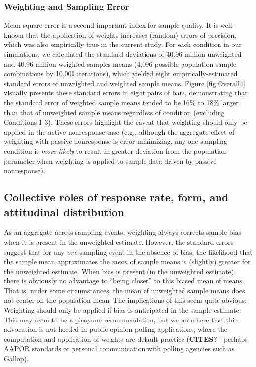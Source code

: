 \documentclass[
  man,mask]{apa7}
\begin{document}
\subsubsection{Weighting and Sampling Error}\label{weighting-and-sampling-error}

Mean square error is a second important index for sample quality. It is well-known that the application of weights increases (random) errors of precision, which was also empirically true in the current study. For each condition in our simulations, we calculated the standard deviations of 40.96 million unweighted and 40.96 million weighted samples means (4,096 possible population-sample combinations by 10,000 iterations), which yielded eight empirically-estimated standard errors of unweighted and weighted sample means. Figure \ref{fig:Overall4} visually presents these standard errors in eight pairs of bars, demonstrating that the standard error of weighted sample means tended to be 16\% to 18\% larger than that of unweighted sample means regardless of condition (excluding Conditions 1-3). These errors highlight the caveat that weighting should only be applied in the active nonresponse case (e.g., although the aggregate effect of weighting with passive nonresponse is error-minimizing, any one sampling condition is \emph{more likely} to result in greater deviation from the population parameter when weighting is applied to sample data driven by passive nonresponse).

\subsection{Collective roles of response rate, form, and attitudinal distribution}\label{collective-roles-of-response-rate-form-and-attitudinal-distribution}

As an aggregate across sampling events, weighting always corrects sample bias when it is present in the unweighted estimate. However, the standard errors suggest that for any \emph{one} sampling event in the absence of bias, the likelihood that the sample mean approximates the \emph{mean} of sample means is (slightly) greater for the unweighted estimate. When bias is present (in the unweighted estimate), there is obviously no advantage to ``being closer'' to this biased mean of means. That is, under some circumstances, the mean of unweighted sample means does not center on the population mean. The implications of this seem quite obvious: Weighting should only be applied if bias is anticipated in the sample estimate. This may seem to be a picayune recommendation, but we note here that this advocation is not heeded in public opinion polling applications, where the computation and application of weights are default practice (\textbf{CITES?} - perhaps AAPOR standards or personal communication with polling agencies such as Gallop).
\end{document}

